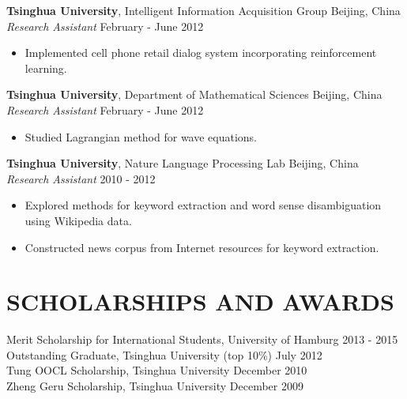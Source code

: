 \documentclass[a4paper,11pt]{article} %
\begin{document}

\textbf{Tsinghua University}, Intelligent Information Acquisition Group \hfill Beijing, China \\
\textit{Research Assistant} \hfill February - June 2012
\vspace{-\parskip}
\begin{itemize}
  \item Implemented cell phone retail dialog system incorporating reinforcement learning.
\end{itemize}


\textbf{Tsinghua University}, Department of Mathematical Sciences \hfill Beijing, China \\
\textit{Research Assistant} \hfill February - June 2012
\vspace{-\parskip}
\begin{itemize}
  \item Studied Lagrangian method for wave equations.
\end{itemize}


\textbf{Tsinghua University}, Nature Language Processing Lab \hfill Beijing, China \\
\textit{Research Assistant} \hfill 2010 - 2012
\vspace{-\parskip}
\begin{itemize}
  \item Explored methods for keyword extraction and word sense disambiguation using Wikipedia data.
  \item Constructed news corpus from Internet resources for keyword extraction.
\end{itemize}


\section{SCHOLARSHIPS AND AWARDS}

Merit Scholarship for International Students, University of Hamburg \hfill 2013 - 2015 \\
Outstanding Graduate, Tsinghua University (top 10\%) \hfill July 2012 \\
Tung OOCL Scholarship, Tsinghua University \hfill December 2010  \\
Zheng Geru Scholarship, Tsinghua University \hfill December 2009
\end{document}
